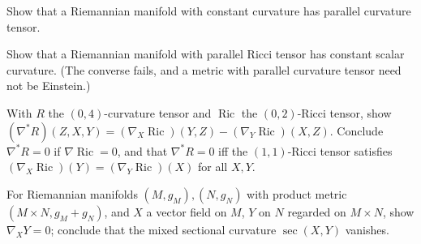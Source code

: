 \begin{remark}
  \label{rem:pet-ch3-ex-6}


  Show that a Riemannian manifold with constant curvature has parallel curvature
  tensor.
\end{remark}

\begin{remark}
  \label{rem:pet-ch3-ex-7}


  Show that a Riemannian manifold with parallel Ricci tensor has constant scalar
  curvature. (The converse fails, and a metric with parallel curvature tensor
  need not be Einstein.)
\end{remark}

\begin{remark}
  \label{rem:pet-ch3-ex-8}


  With $R$ the $(0,4)$-curvature tensor and $\operatorname{Ric}$ the
  $(0,2)$-Ricci tensor, show
  $(\nabla^*R)(Z,X,Y)=(\nabla_X\operatorname{Ric})(Y,Z)-(\nabla_Y\operatorname{Ric})(X,Z)$.
  Conclude $\nabla^*R=0$ if $\nabla\operatorname{Ric}=0$, and that $\nabla^*R=0$
  iff the $(1,1)$-Ricci tensor satisfies $(\nabla_X\operatorname{Ric})(Y)=(\nabla_Y\operatorname{Ric})(X)$
  for all $X,Y$.
\end{remark}

\begin{remark}
  \label{rem:pet-ch3-ex-9}


  For Riemannian manifolds $(M,g_M),(N,g_N)$ with product metric
  $(M\times N,g_M+g_N)$, and $X$ a vector field on $M$, $Y$ on $N$ regarded on
  $M\times N$, show $\nabla_XY=0$; conclude that the mixed sectional curvature
  $\sec(X,Y)$ vanishes.
\end{remark}

